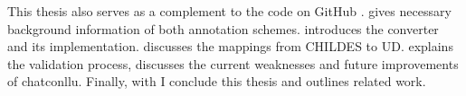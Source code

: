 This thesis also serves as a complement to the code on GitHub .  gives necessary background information of both annotation schemes.  introduces the converter and its implementation.  discusses the mappings from CHILDES to UD.  explains the validation process, discusses the current weaknesses and future improvements of chatconllu. Finally, with  I conclude this thesis and outlines related work.

